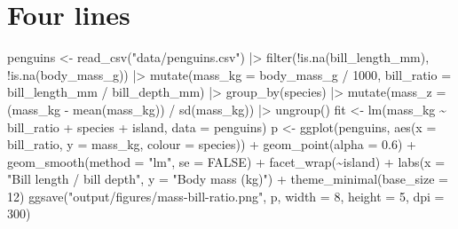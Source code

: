 \documentclass[
  letterpaper,
  justified,
  a4paper]{tufte-book}
\makeatletter
\newenvironment{Shaded}{\begin{snugshade}}{\end{snugshade}}
\newcommand{\AttributeTok}[1]{\textcolor[rgb]{0.40,0.45,0.13}{#1}}
\newcommand{\ConstantTok}[1]{\textcolor[rgb]{0.56,0.35,0.01}{#1}}
\newcommand{\DecValTok}[1]{\textcolor[rgb]{0.68,0.00,0.00}{#1}}
\newcommand{\FloatTok}[1]{\textcolor[rgb]{0.68,0.00,0.00}{#1}}
\newcommand{\FunctionTok}[1]{\textcolor[rgb]{0.28,0.35,0.67}{#1}}
\newcommand{\NormalTok}[1]{\textcolor[rgb]{0.00,0.23,0.31}{#1}}
\newcommand{\OtherTok}[1]{\textcolor[rgb]{0.00,0.23,0.31}{#1}}
\newcommand{\SpecialCharTok}[1]{\textcolor[rgb]{0.37,0.37,0.37}{#1}}
\newcommand{\StringTok}[1]{\textcolor[rgb]{0.13,0.47,0.30}{#1}}
\let\rbporigShaded\Shaded
\let\rbporigendShaded\endShaded
\renewenvironment{Shaded}{%
  \begingroup
  \ifdim\linewidth=\rbpbodywidth
    \advance\linewidth by \@tufte@overhang
    \advance\hsize by \@tufte@overhang
    \advance\columnwidth by \@tufte@overhang
  \fi
  \rbporigShaded
}{%
  \rbporigendShaded
  \endgroup
}
\makeatother
\begin{document}
\section{Four lines}

\begin{Shaded}
\begin{Highlighting}[]
\NormalTok{penguins }\OtherTok{\textless{}{-}} \FunctionTok{read\_csv}\NormalTok{(}\StringTok{"data/penguins.csv"}\NormalTok{) }\SpecialCharTok{|\textgreater{}} \FunctionTok{filter}\NormalTok{(}\SpecialCharTok{!}\FunctionTok{is.na}\NormalTok{(bill\_length\_mm), }\SpecialCharTok{!}\FunctionTok{is.na}\NormalTok{(body\_mass\_g)) }\SpecialCharTok{|\textgreater{}} \FunctionTok{mutate}\NormalTok{(}\AttributeTok{mass\_kg =}\NormalTok{ body\_mass\_g }\SpecialCharTok{/} \DecValTok{1000}\NormalTok{, }\AttributeTok{bill\_ratio =}\NormalTok{ bill\_length\_mm }\SpecialCharTok{/}\NormalTok{ bill\_depth\_mm) }\SpecialCharTok{|\textgreater{}} \FunctionTok{group\_by}\NormalTok{(species) }\SpecialCharTok{|\textgreater{}} \FunctionTok{mutate}\NormalTok{(}\AttributeTok{mass\_z =}\NormalTok{ (mass\_kg }\SpecialCharTok{{-}} \FunctionTok{mean}\NormalTok{(mass\_kg)) }\SpecialCharTok{/} \FunctionTok{sd}\NormalTok{(mass\_kg)) }\SpecialCharTok{|\textgreater{}} \FunctionTok{ungroup}\NormalTok{()}
\NormalTok{fit }\OtherTok{\textless{}{-}} \FunctionTok{lm}\NormalTok{(mass\_kg }\SpecialCharTok{\textasciitilde{}}\NormalTok{ bill\_ratio }\SpecialCharTok{+}\NormalTok{ species }\SpecialCharTok{+}\NormalTok{ island, }\AttributeTok{data =}\NormalTok{ penguins)}
\NormalTok{p }\OtherTok{\textless{}{-}} \FunctionTok{ggplot}\NormalTok{(penguins, }\FunctionTok{aes}\NormalTok{(}\AttributeTok{x =}\NormalTok{ bill\_ratio, }\AttributeTok{y =}\NormalTok{ mass\_kg, }\AttributeTok{colour =}\NormalTok{ species)) }\SpecialCharTok{+} \FunctionTok{geom\_point}\NormalTok{(}\AttributeTok{alpha =} \FloatTok{0.6}\NormalTok{) }\SpecialCharTok{+} \FunctionTok{geom\_smooth}\NormalTok{(}\AttributeTok{method =} \StringTok{"lm"}\NormalTok{, }\AttributeTok{se =} \ConstantTok{FALSE}\NormalTok{) }\SpecialCharTok{+} \FunctionTok{facet\_wrap}\NormalTok{(}\SpecialCharTok{\textasciitilde{}}\NormalTok{island) }\SpecialCharTok{+} \FunctionTok{labs}\NormalTok{(}\AttributeTok{x =} \StringTok{"Bill length / bill depth"}\NormalTok{, }\AttributeTok{y =} \StringTok{"Body mass (kg)"}\NormalTok{) }\SpecialCharTok{+} \FunctionTok{theme\_minimal}\NormalTok{(}\AttributeTok{base\_size =} \DecValTok{12}\NormalTok{)}
\FunctionTok{ggsave}\NormalTok{(}\StringTok{"output/figures/mass{-}bill{-}ratio.png"}\NormalTok{, p, }\AttributeTok{width =} \DecValTok{8}\NormalTok{, }\AttributeTok{height =} \DecValTok{5}\NormalTok{, }\AttributeTok{dpi =} \DecValTok{300}\NormalTok{)}
\end{Highlighting}
\end{Shaded}
\end{document}
